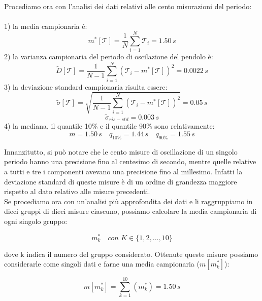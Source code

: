 \documentclass[12pt, twoside, a4paper]{article}
\begin{document}
Procediamo ora con l'analisi dei dati relativi alle cento misurazioni del periodo:\\
\\
1) la media campionaria é:
\begin{equation}
	m^*[\mathcal{T}] = \frac{1}{N} \sum_{i=1}^{N} \mathcal{T}_i = 1.50\,s
\end{equation} 
2) la varianza campionaria del periodo di oscilazione del pendolo è:
\begin{equation}
	\tilde{D}[\mathcal{T}] = \frac{1}{N - 1} \sum_{i=1}^{N} (\mathcal{T}_i - m^*[\mathcal{T}])^2 = 0.0022\,s
\end{equation}
3) la deviazione standard campionaria risulta essere:
\begin{equation}
	\tilde{\sigma}[\mathcal{T}] = \sqrt{\frac{1}{N - 1} \sum_{i=1}^{N} (\mathcal{T}_i - m^*[\mathcal{T}])^2} = 0.05\,s
\end{equation}
\begin{equation}
	\tilde{\sigma}_{ris-std} = 0.003\,s
\end{equation}
4) la mediana, il quantile 10\% e il quantile 90\% sono relativamente:
\begin{equation*}
	m = 1.50\,s \quad
	q_{10\%} = 1.44\,s \quad
	q_{90\%} = 1.55\,s
\end{equation*}

Innanzitutto, si può notare che le cento misure di oscillazione di un singolo periodo hanno una precisione fino al centesimo di secondo, mentre quelle relative a tutti e tre i componenti avevano una precisione fino al millesimo. Infatti la deviazione standard di queste misure è di un ordine di grandezza maggiore rispetto al dato relativo alle misure precedenti.\\
Se procediamo ora con un'analisi più approfondita dei dati e li raggruppiamo in dieci gruppi di dieci misure ciascuno, possiamo calcolare la media campionaria di ogni singolo gruppo:

\begin{equation}
m_k^* \quad con \,\, K \in{\{1,2,...,10\}}
\end{equation}

dove k indica il numero del gruppo considerato.
Ottenute queste misure possiamo considerarle come singoli dati e farne una media campionaria ($ m[m_k^*] $):

\begin{equation}
m[m_k^*] = \sum_{k=1}^{10} (m_k^*) = 1.50\,s
\end{equation}
\end{document}
